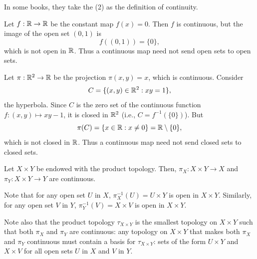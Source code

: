\begin{remark}
  In some books, they take the (2) as the definition of continuity.
\end{remark}


\begin{example}
  Let \(f:\mathbb{R}\to\mathbb{R}\) be the constant map \(f(x)=0\). Then \(f\) is continuous, but the image of the open set \((0,1)\) is
  \[
    f((0,1))=\{0\},
  \]
  which is not open in \(\mathbb{R}\). Thus a continuous map need not send open sets to open sets.
\end{example}

\begin{example}
  Let $\pi:\mathbb{R}^2\to\mathbb{R}$ be the projection $\pi(x,y)=x$, which is continuous. Consider
  \[
    C=\{(x,y)\in\mathbb{R}^2: xy=1\},
  \]
  the hyperbola. Since $C$ is the zero set of the continuous function $f:(x,y)\mapsto xy-1$, it is closed in $\mathbb{R}^2$ (i.e., $C=f^{-1}(\{0\})$). But
  \[
    \pi(C)=\{x\in\mathbb{R}:x\neq0\}=\mathbb{R}\setminus\{0\},
  \]
  which is not closed in $\mathbb{R}$. Thus a continuous map need not send closed sets to closed sets.
\end{example}

\begin{example}
  Let $X\times Y$ be endowed with the product topology. Then, $\pi_X:X\times Y\to X$ and $\pi_Y:X\times Y\to Y$ are continuous.

  Note that for any open set $U$ in $X$, $\pi_X^{-1}(U)=U\times Y$ is open in $X\times Y$. Similarly, for any open set $V$ in $Y$, $\pi_Y^{-1}(V)=X\times V$ is open in $X\times Y$.

  Note also that the product topology $\tau_{X\times Y}$ is the smallest topology on $X\times Y$ such that both $\pi_X$ and $\pi_Y$ are continuous: any topology on $X\times Y$ that makes both $\pi_X$ and $\pi_Y$ continuous must contain a basis for $\tau_{X\times Y}$: sets of the form $U\times Y$ and $X\times V$ for all open sets $U$ in $X$ and $V$ in $Y$. 
\end{example}

